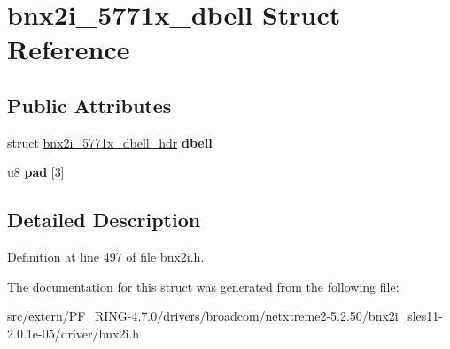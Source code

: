 \hypertarget{structbnx2i__5771x__dbell}{
\section{bnx2i\_\-5771x\_\-dbell Struct Reference}
\label{structbnx2i__5771x__dbell}
}
\subsection*{Public Attributes}
\begin{DoxyCompactItemize}
\item 
\hypertarget{structbnx2i__5771x__dbell_af3df3e83b311535f2c643c8346e8c19a}{
struct \hyperlink{structbnx2i__5771x__dbell__hdr}{bnx2i\_\-5771x\_\-dbell\_\-hdr} {\bfseries dbell}}
\label{structbnx2i__5771x__dbell_af3df3e83b311535f2c643c8346e8c19a}

\item 
\hypertarget{structbnx2i__5771x__dbell_a6f1e740f83c67006dcb70495eb70433c}{
u8 {\bfseries pad} \mbox{[}3\mbox{]}}
\label{structbnx2i__5771x__dbell_a6f1e740f83c67006dcb70495eb70433c}

\end{DoxyCompactItemize}


\subsection{Detailed Description}


Definition at line 497 of file bnx2i.h.



The documentation for this struct was generated from the following file:\begin{DoxyCompactItemize}
\item 
src/extern/PF\_\-RING-\/4.7.0/drivers/broadcom/netxtreme2-\/5.2.50/bnx2i\_\-sles11-\/2.0.1e-\/05/driver/bnx2i.h\end{DoxyCompactItemize}
